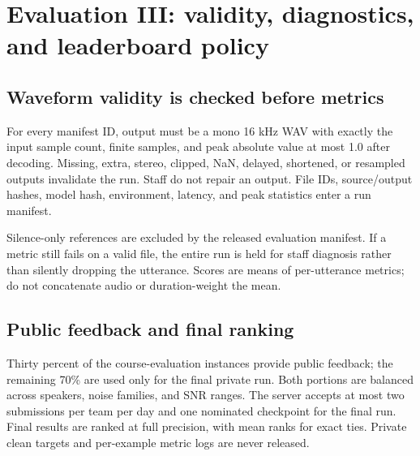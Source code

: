 \documentclass[11pt,letterpaper]{article}
\newcommand{\page}[1]{\clearpage\section{#1}}
\begin{document}
\begin{center}
\end{center}

\page{Evaluation III: validity, diagnostics, and leaderboard policy}
\subsection{Waveform validity is checked before metrics}
For every manifest ID, output must be a mono 16 kHz WAV with exactly the input sample count, finite samples, and peak absolute value at most 1.0 after decoding. Missing, extra, stereo, clipped, NaN, delayed, shortened, or resampled outputs invalidate the run. Staff do not repair an output. File IDs, source/output hashes, model hash, environment, latency, and peak statistics enter a run manifest.

Silence-only references are excluded by the released evaluation manifest. If a metric still fails on a valid file, the entire run is held for staff diagnosis rather than silently dropping the utterance. Scores are means of per-utterance metrics; do not concatenate audio or duration-weight the mean.

\subsection{Public feedback and final ranking}
Thirty percent of the course-evaluation instances provide public feedback; the remaining 70\% are used only for the final private run. Both portions are balanced across speakers, noise families, and SNR ranges. The server accepts at most two submissions per team per day and one nominated checkpoint for the final run. Final results are ranked at full precision, with mean ranks for exact ties. Private clean targets and per-example metric logs are never released.
\end{document}
